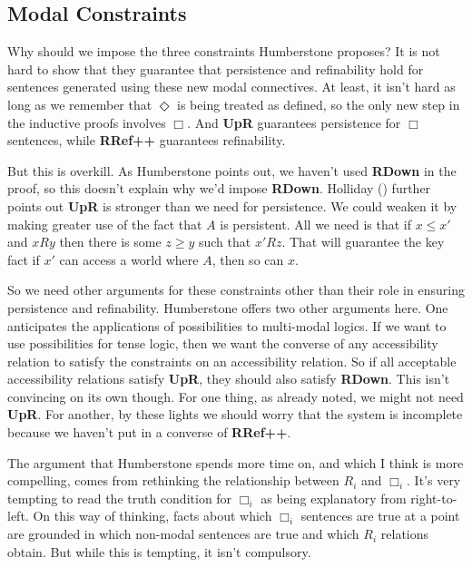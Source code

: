 \documentclass[
  11pt,
  letterpaper,
  DIV=11,
  numbers=noendperiod,
  twoside]{scrartcl}
\begin{document}
\subsection*{Modal Constraints}\label{modal-constraints}

Why should we impose the three constraints Humberstone proposes? It is
not hard to show that they guarantee that persistence and refinability
hold for sentences generated using these new modal connectives. At
least, it isn't hard as long as we remember that \(\Diamond\) is being
treated as defined, so the only new step in the inductive proofs
involves \(\Box\). And \textbf{UpR} guarantees persistence for \(\Box\)
sentences, while \textbf{RRef++} guarantees refinability.

But this is overkill. As Humberstone points out, we haven't used
\textbf{RDown} in the proof, so this doesn't explain why we'd impose
\textbf{RDown}. Holliday () further
points out \textbf{UpR} is stronger than we need for persistence. We
could weaken it by making greater use of the fact that \(A\) is
persistent. All we need is that if \(x \leqslant x'\) and \(xRy\) then
there is some \(z \geqslant y\) such that \(x'Rz\). That will guarantee
the key fact if \(x'\) can access a world where \(A\), then so can
\(x\).

So we need other arguments for these constraints other than their role
in ensuring persistence and refinability. Humberstone offers two other
arguments here. One anticipates the applications of possibilities to
multi-modal logics. If we want to use possibilities for tense logic,
then we want the converse of any accessibility relation to satisfy the
constraints on an accessibility relation. So if all acceptable
accessibility relations satisfy \textbf{UpR}, they should also satisfy
\textbf{RDown}. This isn't convincing on its own though. For one thing,
as already noted, we might not need \textbf{UpR}. For another, by these
lights we should worry that the system is incomplete because we haven't
put in a converse of \textbf{RRef++}.

The argument that Humberstone spends more time on, and which I think is
more compelling, comes from rethinking the relationship between \(R_i\)
and \(\Box_i\). It's very tempting to read the truth condition for
\(\Box_i\) as being explanatory from right-to-left. On this way of
thinking, facts about which \(\Box_i\) sentences are true at a point are
grounded in which non-modal sentences are true and which \(R_i\)
relations obtain. But while this is tempting, it isn't compulsory.
\end{document}

